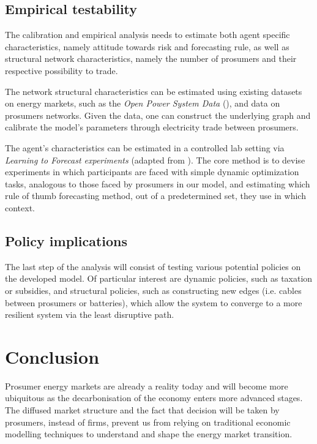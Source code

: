 \documentclass[american]{scrartcl}
\begin{document}
\subsection{Empirical testability}

The calibration and empirical analysis needs to estimate both agent specific characteristics, namely attitude towards risk and forecasting rule, as well as structural network characteristics, namely the number of prosumers and their respective possibility to trade.

The network structural characteristics can be estimated using existing datasets on energy markets, such as the \textit{Open Power System Data} (\cite{Wiese2019}), and data on prosumers networks. Given the data, one can construct the underlying graph and calibrate the model's parameters through electricity trade between prosumers.

The agent's characteristics can be estimated in a controlled lab setting via \textit{Learning to Forecast experiments} (adapted from \cite{Hommes2013}). The core method is to devise experiments in which participants are faced with simple dynamic optimization tasks, analogous to those faced by prosumers in our model, and estimating which rule of thumb forecasting method, out of a predetermined set, they use in which context.

\subsection{Policy implications}

The last step of the analysis will consist of testing various potential policies on the developed model. Of particular interest are dynamic policies, such as taxation or subsidies, and structural policies, such as constructing new edges (i.e. cables between prosumers or batteries), which allow the system to converge to a more resilient system via the least disruptive path.


\section{Conclusion}

Prosumer energy markets are already a reality today and will become more ubiquitous as the decarbonisation of the economy enters more advanced stages. The diffused market structure and the fact that decision will be taken by prosumers, instead of firms, prevent us from relying on traditional economic modelling techniques to understand and shape the energy market transition.
\end{document}
